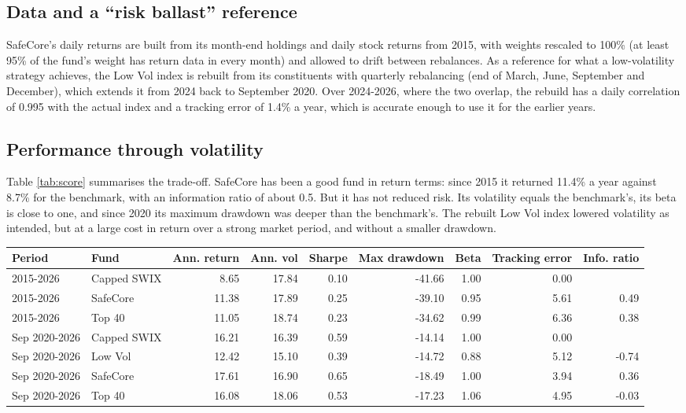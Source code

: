 \documentclass[11pt,preprint]{elsarticle}
\let\origtable\table
\let\endorigtable\endtable
\renewenvironment{table}[1][2] {
    \expandafter\origtable\expandafter[H]
} {
    \endorigtable
}
\numberwithin{equation}{section}
\numberwithin{figure}{section}
\numberwithin{table}{section}
\begin{document}
\subsection{Data and a ``risk ballast''
reference}\label{data-and-a-risk-ballast-reference}

SafeCore's daily returns are built from its month-end holdings and daily
stock returns from 2015, with weights rescaled to 100\% (at least 95\%
of the fund's weight has return data in every month) and allowed to
drift between rebalances. As a reference for what a low-volatility
strategy achieves, the Low Vol index is rebuilt from its constituents
with quarterly rebalancing (end of March, June, September and December),
which extends it from 2024 back to September 2020. Over 2024-2026, where
the two overlap, the rebuild has a daily correlation of 0.995 with the
actual index and a tracking error of 1.4\% a year, which is accurate
enough to use it for the earlier years.

\subsection{Performance through
volatility}\label{performance-through-volatility}

Table \ref{tab:score} summarises the trade-off. SafeCore has been a good
fund in return terms: since 2015 it returned 11.4\% a year against 8.7\%
for the benchmark, with an information ratio of about 0.5. But it has
not reduced risk. Its volatility equals the benchmark's, its beta is
close to one, and since 2020 its maximum drawdown was deeper than the
benchmark's. The rebuilt Low Vol index lowered volatility as intended,
but at a large cost in return over a strong market period, and without a
smaller drawdown.

\begin{table}[H]
\centering
\caption{Risk and return scorecard vs the Capped SWIX (returns, volatility, drawdown and tracking error in \%; Sharpe ratio uses STeFI as the risk-free rate) \label{tab:score}} 
\begin{tabular}{llrrrrrrr}
  \toprule
Period & Fund & Ann. return & Ann. vol & Sharpe & Max drawdown & Beta & Tracking error & Info. ratio \\ 
  \midrule
2015-2026 & Capped SWIX & 8.65 & 17.84 & 0.10 & -41.66 & 1.00 & 0.00 &  \\ 
  2015-2026 & SafeCore & 11.38 & 17.89 & 0.25 & -39.10 & 0.95 & 5.61 & 0.49 \\ 
  2015-2026 & Top 40 & 11.05 & 18.74 & 0.23 & -34.62 & 0.99 & 6.36 & 0.38 \\ 
  Sep 2020-2026 & Capped SWIX & 16.21 & 16.39 & 0.59 & -14.14 & 1.00 & 0.00 &  \\ 
  Sep 2020-2026 & Low Vol & 12.42 & 15.10 & 0.39 & -14.72 & 0.88 & 5.12 & -0.74 \\ 
  Sep 2020-2026 & SafeCore & 17.61 & 16.90 & 0.65 & -18.49 & 1.00 & 3.94 & 0.36 \\ 
  Sep 2020-2026 & Top 40 & 16.08 & 18.06 & 0.53 & -17.23 & 1.06 & 4.95 & -0.03 \\ 
   \bottomrule
\end{tabular}
\end{table}
\end{document}
